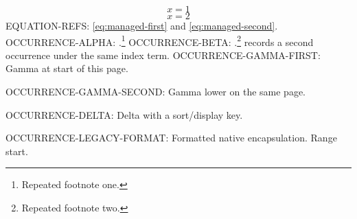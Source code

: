 \documentclass{impereport_zh}
\begin{document}
\begin{equation}\label{eq:managed-first} x=1 \end{equation}
\setcounter{equation}{0}
\begin{equation}\label{eq:managed-second} x=2 \end{equation}
EQUATION-REFS: \eqref{eq:managed-first} and \eqref{eq:managed-second}.
\clearpage
\setcounter{page}{1}
\setcounter{footnote}{0}
OCCURRENCE-ALPHA: .\footnote{Repeated footnote one.}
\clearpage
\setcounter{page}{1}
\setcounter{footnote}{0}
OCCURRENCE-BETA: .\footnote{Repeated footnote two.}
 records a second occurrence under the same index term.
\clearpage
\setcounter{page}{1}
OCCURRENCE-GAMMA-FIRST: Gamma at start of this page.
\par\vspace{4cm}
OCCURRENCE-GAMMA-SECOND: Gamma lower on the same page.
\par
OCCURRENCE-DELTA: Delta with a sort/display key.
\par
OCCURRENCE-LEGACY-FORMAT: Formatted native encapsulation.
Range start. 
\clearpage
\printindex

\end{document}
